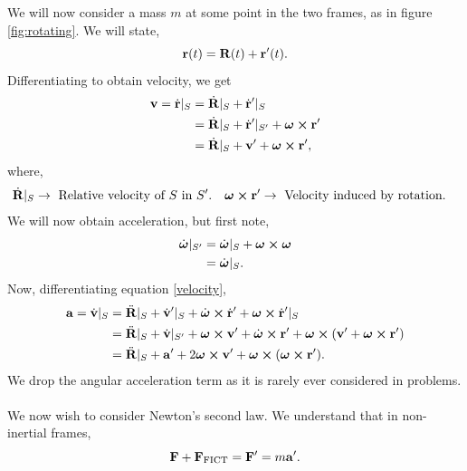 \documentclass{book}
\begin{document}
We will now consider a mass $m$ at some point in the two frames, as in figure \ref{fig:rotating}. We will state,
\begin{equation}
    \vb{r}(t) = \vb{R}(t) + \vb{r}'(t).
\end{equation}
Differentiating to obtain velocity, we get
\begin{equation}\label{velocity}
    \begin{split}
        \vb{v} = \Dot{\vb{r}}|_S & = \Dot{\vb{R}}|_S + \Dot{\vb{r}}'|_S \\
        & = \Dot{\vb{R}}|_S + \Dot{\vb{r}}'|_{S'} + \vb*{\omega}\cross\vb{r}' \\
        & = \Dot{\vb{R}}|_S + \vb{v}' + \vb*{\omega}\cross\vb{r}',
    \end{split}
\end{equation}
where,
\begin{align}
    \Dot{\vb{R}}|_S &\to \text{ Relative velocity of $S$ in $S'$.} & \vb*{\omega}\cross\vb{r}' &\to \text{ Velocity induced by rotation.}
\end{align}
We will now obtain acceleration, but first note,
\begin{equation}
    \begin{split}
        \Dot{\vb*{\omega}}|_{S'} & = \Dot{\vb*{\omega}}|_S + \vb*{\omega}\cross\vb*{\omega} \\
        & = \Dot{\vb*{\omega}}|_S.
    \end{split}
\end{equation}
Now, differentiating equation \eqref{velocity},
\begin{equation}
\begin{split}
    \vb{a} = \Dot{\vb{v}}|_S & = \Ddot{\vb{R}}|_S + \Dot{\vb{v}}'|_S + \Dot{\vb*{\omega}}\cross\Dot{\vb{r}}' + \vb*{\omega}\cross\Dot{\vb{r}}'|_S \\
    & = \Ddot{\vb{R}}|_S + \Dot{\vb{v}}|_{S'} + \vb*{\omega}\cross\vb{v}' + \Dot{\vb*{\omega}}\cross \vb{r}' + \vb*{\omega} \cross(\vb{v'} + \vb*{\omega}\cross \vb{r}') \\
    & =  \Ddot{\vb{R}}|_S + \vb{a}' + 2\vb*{\omega}\cross\vb{v}' + \vb*{\omega}\cross(\vb*{\omega}\cross \vb{r}').
\end{split}
\end{equation}
We drop the angular acceleration term as it is rarely ever considered in problems. \\\\
We now wish to consider Newton's second law. We understand that in non-inertial frames,
\begin{equation}
    \vb{F} + \vb{F}_{\text{FICT}} = \vb{F}' = m\vb{a}'.
\end{equation}
\end{document}
